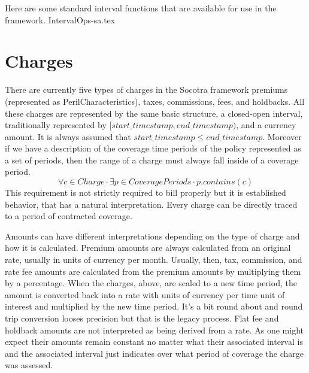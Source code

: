Here are some standard interval functions that are available for use in the framework.
{IntervalOps-sa.tex}

\section{Charges}
\label{sec:03:5}

There are currently five types of charges in the Socotra framework premiums (represented as PerilCharacteristics), taxes,
commissions, fees, and holdbacks. All these charges are represented by the same basic structure, a closed-open
interval, traditionally represented by $[start\_timestamp, end\_timestamp)$, and a currency amount. It is
always assumed that $start\_timestamp \leq end\_timestamp$. Moreover if we have a description of the
coverage time periods of the policy represented as a set of periods, then the range of a charge must always
fall inside of a coverage period.
\begin{equation*}
\forall c \in Charge \cdot \exists p \in CoveragePeriods \cdot p.contains(c)
\end{equation*}
This requirement is not strictly required to bill properly but it is established behavior, that has a natural
interpretation. Every charge can be directly traced to a period of contracted coverage.

Amounts can have different interpretations depending on the type of charge and how it is calculated.
Premium amounts are always calculated from an original rate, usually in units of currency per month. Usually, then,
tax, commission, and rate fee amounts are calculated from the premium amounts by multiplying them by a percentage.
When the charges, above, are scaled to a new time period, the amount is converted back into
a rate with units of currency per time unit of interest and multiplied by the new time period. It's a bit
round about and round trip conversion looses precision but that is the legacy process. Flat fee and holdback amounts are
not interpreted as being derived from a rate. As one might expect their amounts remain constant no
matter what their associated interval is and the associated interval just indicates over what period of coverage the
charge was assessed.

